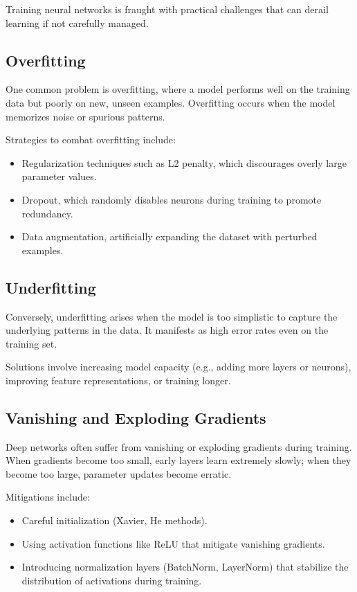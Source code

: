 \documentclass[openany]{book}
\begin{document}
Training neural networks is fraught with practical challenges that can derail 
learning if not carefully managed.

\subsection{Overfitting}

One common problem is overfitting, where a model performs well on the training 
data but poorly on new, unseen examples. Overfitting occurs when the model 
memorizes noise or spurious patterns.

Strategies to combat overfitting include:
\begin{itemize}
    \item Regularization techniques such as L2 penalty, which discourages overly
     large parameter values.
    \item Dropout, which randomly disables neurons during training to promote 
    redundancy.
    \item Data augmentation, artificially expanding the dataset with perturbed 
    examples.
\end{itemize}

\subsection{Underfitting}

Conversely, underfitting arises when the model is too simplistic to capture the 
underlying patterns in the data. It manifests as high error rates even on the 
training set.

Solutions involve increasing model capacity (e.g., adding more layers or 
neurons), improving feature representations, or training longer.

\subsection{Vanishing and Exploding Gradients}

Deep networks often suffer from vanishing or exploding gradients during 
training. When gradients become too small, early layers learn extremely slowly; 
when they become too large, parameter updates become erratic.

Mitigations include:
\begin{itemize}
    \item Careful initialization (Xavier, He methods).
    \item Using activation functions like ReLU that mitigate vanishing 
    gradients.
    \item Introducing normalization layers (BatchNorm, LayerNorm) that stabilize 
    the distribution of activations during training.
\end{itemize}
\end{document}
